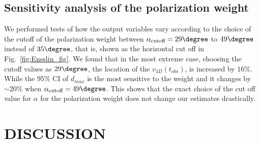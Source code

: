 \documentclass[letterpaper,useAMS,usenatbib]{mn2e}
\begin{document}
\subsection{Sensitivity analysis of the polarization weight}
%
\label{sec:sensitivityTests}
We performed tests of how the output variables vary according to the
choice of the cutoff of the polarization weight between
$\alpha_{\text{cutoff}} =
29 \degree$ to $49\degree$ instead of $35 \degree$, that is, shown as the
horizontal cut off in Fig.~\ref{fig:Ensslin_fig}.
We found that in the most extreme case, choosing the cutoff values as $29
\degree$, the location of the $v_{3D}(t_{obs})$, is
increased by $16 \%$. While the $95\%$ CI of $d_{max}$ is
the most sensitive to the weight and it changes by
$\sim20 \%$ when $\alpha_{\text{cutoff}} = 49 \degree$. 
This shows that the exact choice of the cut off value for $\alpha$ for the
polarization weight does not change our estimates drastically.


\section{DISCUSSION}
\end{document}
